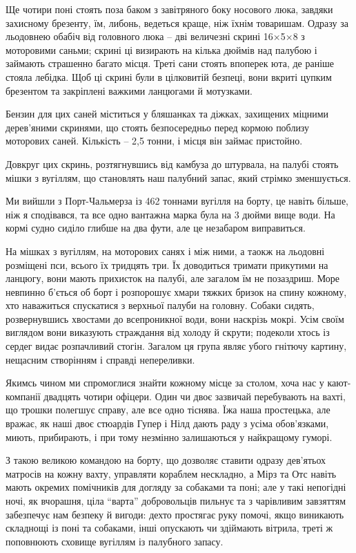 Ще чотири поні стоять поза баком з завітряного боку носового люка, завдяки
захисному брезенту, їм, либонь, ведеться краще, ніж їхнім товаришам. Одразу за
льодовнею обабіч від головного люка – дві величезні скрині 16×5×8 з моторовими
саньми; скрині ці визирають на кілька дюймів над палубою і займають страшенно
багато місця. Треті сани стоять впоперек юта, де раніше стояла лебідка. Щоб ці
скрині були в цілковитій безпеці, вони вкриті цупким брезентом та закріплені
важкими ланцюгами й мотузками.

Бензин для цих саней міститься у бляшанках та діжках, захищених міцними
дерев’яними скринями, що стоять безпосередньо перед кормою поблизу моторових
саней. Кількість – 2,5 тонни, і місця він займає пристойно.

Довкруг цих скринь, розтягнувшись від камбуза до штурвала, на палубі стоять
мішки з вугіллям, що становлять наш палубний запас, який стрімко зменшується.

Ми вийшли з Порт-Чальмерза із 462 тоннами вугілля на борту, це навіть більше,
ніж я сподівався, та все одно вантажна марка була на 3 дюйми вище води. На
кормі судно сиділо глибше на два фути, але це незабаром виправиться. 

На мішках з вугіллям, на моторових санях і між ними, а таокж на льодовні
розміщені пси, всього їх тридцять три. Їх доводиться тримати прикутими на
ланцюгу, вони мають прихисток на палубі, але загалом їм не позаздриш. Море
невпинно б’ється об борт і розпорошує хмари тяжких бризок на спину кожному, хто
наважиться спускатися з верхньої палуби на головну. Собаки сидять,
розвернувшись хвостами до всепроникної води, вони наскрізь мокрі. Усім своїм
виглядом вони виказують страждання від холоду й скрути; подеколи хтось із
сердег видає розпачливий стогін. Загалом ця група являє убого гнітючу картину,
нещасним створінням і справді непереливки.

Якимсь чином ми спромоглися знайти кожному місце за столом, хоча нас у
кают-компанії двадцять чотири офіцери. Один чи двоє зазвичай перебувають на
вахті, що трошки полегшує справу, але все одно тіснява. Їжа наша простецька,
але вражає, як наші двоє стюардів Гупер і Нілд дають раду з усіма обов’язками,
миють, прибирають, і при тому незмінно залишаються у найкращому гуморі.

З такою великою командою на борту, що дозволяє ставити одразу дев’ятьох
матросів на кожну вахту, управляти кораблем нескладно, а Мірз та Отс навіть
мають окремих помічників для догляду за собаками та поні; але у такі непогідні
ночі, як вчорашня, ціла \enquote{варта} добровольців пильнує та з чарівливим завзяттям
забезпечує нам безпеку й вигоди: дехто простягає руку помочі, якщо виникають
складнощі із поні та собаками, інші опускають чи здіймають вітрила, треті ж
поповнюють сховище вугіллям із палубного запасу.

